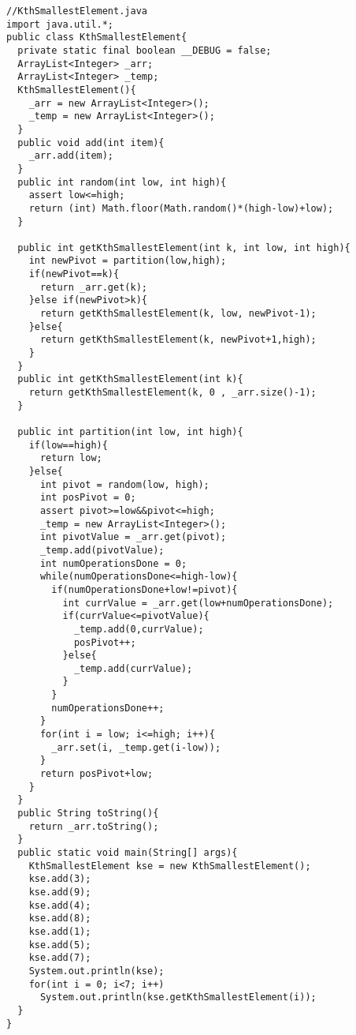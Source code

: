 \documentclass[11pt]{article}
\theoremstyle{definition}
\begin{document}
\begin{verbatim}
//KthSmallestElement.java
import java.util.*;
public class KthSmallestElement{
  private static final boolean __DEBUG = false;
  ArrayList<Integer> _arr;
  ArrayList<Integer> _temp;
  KthSmallestElement(){
    _arr = new ArrayList<Integer>();
    _temp = new ArrayList<Integer>();
  }
  public void add(int item){
    _arr.add(item);
  }
  public int random(int low, int high){
    assert low<=high;
    return (int) Math.floor(Math.random()*(high-low)+low);
  }
  
  public int getKthSmallestElement(int k, int low, int high){
    int newPivot = partition(low,high);
    if(newPivot==k){
      return _arr.get(k);
    }else if(newPivot>k){
      return getKthSmallestElement(k, low, newPivot-1);
    }else{
      return getKthSmallestElement(k, newPivot+1,high);
    }
  }
  public int getKthSmallestElement(int k){
    return getKthSmallestElement(k, 0 , _arr.size()-1);
  }
  
  public int partition(int low, int high){
    if(low==high){
      return low;
    }else{
      int pivot = random(low, high);
      int posPivot = 0;
      assert pivot>=low&&pivot<=high;
      _temp = new ArrayList<Integer>();
      int pivotValue = _arr.get(pivot);
      _temp.add(pivotValue);
      int numOperationsDone = 0;
      while(numOperationsDone<=high-low){
        if(numOperationsDone+low!=pivot){
          int currValue = _arr.get(low+numOperationsDone);
          if(currValue<=pivotValue){
            _temp.add(0,currValue);
            posPivot++;
          }else{
            _temp.add(currValue);
          }
        }
        numOperationsDone++;
      }
      for(int i = low; i<=high; i++){
        _arr.set(i, _temp.get(i-low));
      }
      return posPivot+low;
    }
  }
  public String toString(){
    return _arr.toString();
  }
  public static void main(String[] args){
    KthSmallestElement kse = new KthSmallestElement();
    kse.add(3);
    kse.add(9);
    kse.add(4);
    kse.add(8);
    kse.add(1);
    kse.add(5);
    kse.add(7);
    System.out.println(kse);
    for(int i = 0; i<7; i++)
      System.out.println(kse.getKthSmallestElement(i));
  }
}
\end{verbatim}
\end{document}
